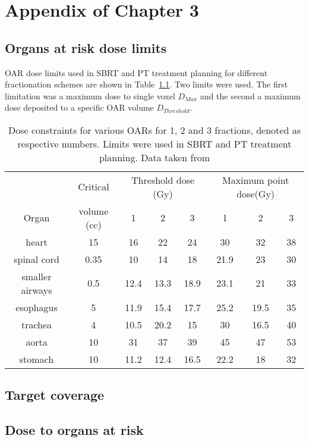  
\chapter{Appendix of Chapter 3}

\section{Organs at risk dose limits}

OAR dose limits used in SBRT and PT treatment planning for different fractionation schemes are shown in Table~\ref{tab:oarlimits}. Two limits were used. The first limitation was a maximum dose to single voxel $D_{Max}$ and the second a maximum dose deposited to a 
specific OAR volume $D_{Threshold}$.

\begin{table}[H]
  \centering
  \caption{Dose constraints for various OARs for 1, 2 and 3 fractions, denoted as respective numbers. Limits were used in SBRT and PT treatment planning. Data taken from \cite{Benedict2010}}
  \begin{tabular}{c|c|c|c|c|c|c|c}
   & Critical  & \multicolumn{3}{c}{Threshold dose (Gy)} & \multicolumn{3}{|c}{Maximum point dose(Gy)}  \\
  Organ & volume (cc) & 1 & 2 & 3 & 1 & 2 & 3 \\
   \hline
   heart & 15 & 16 & 22 & 24 & 30 & 32 & 38\\
spinal cord & 0.35 & 10 & 14 & 18 & 21.9 & 23 & 30\\
smaller airways & 0.5 & 12.4 & 13.3 & 18.9 & 23.1 & 21 & 33\\
esophagus & 5 & 11.9 & 15.4 & 17.7 & 25.2 & 19.5 & 35\\
trachea & 4 & 10.5 & 20.2 & 15 & 30 & 16.5 & 40\\
aorta & 10 & 31 & 37 & 39 & 45 & 47 & 53\\
stomach & 10 & 11.2 & 12.4 & 16.5 & 22.2 & 18 & 32\\
\hline\hline
  
  \end{tabular}
  \label{tab:oarlimits}
\end{table}

\section{Target coverage}

\newpage
\section{Dose to organs at risk}

